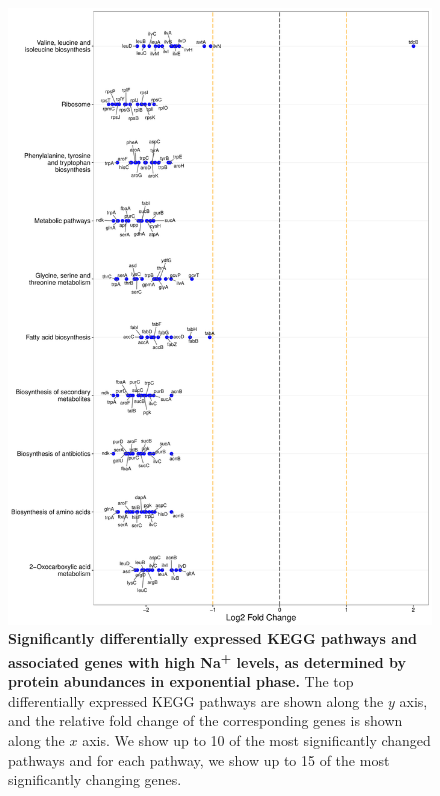 \documentclass[a4paper]{article}
\begin{document}
\clearpage
\begin{figure}
	\includegraphics[width=1.0\textwidth]{../../d_figures/kegg_14.pdf}
	\caption[Significantly differentially expressed KEGG pathways for protein samples in exponential phase tested for high Na\textsuperscript{+} against base Na\textsuperscript{+}]
	{\textbf{Significantly differentially expressed KEGG pathways and associated genes with high Na\textsuperscript{+} levels, as determined by protein abundances in exponential phase.} The top differentially expressed KEGG pathways are shown along the $y$ axis, and the relative fold change of the corresponding genes is shown along the $x$ axis. We show up to 10 of the most significantly changed pathways and for each pathway, we show up to 15 of the most significantly changing genes.}
\end{figure}
\end{document}
